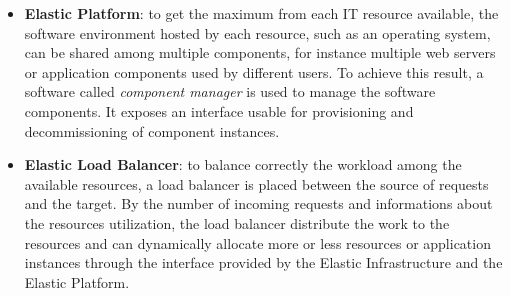 \begin{itemize}
	\item \textbf{Elastic Platform}: to get the maximum from each IT resource available, the software environment hosted by each resource, such as an operating system, can be shared among multiple components, for instance multiple web servers or application components used by different users. To achieve this result, a software called  \textit{component manager} is used to manage the software components. It exposes an interface usable for provisioning and decommissioning of component instances.
	\item \textbf{Elastic Load Balancer}: to balance correctly the workload among the available resources, a load balancer is placed between the source of requests and the target. By the number of incoming requests and informations about the resources utilization, the load balancer distribute the work to the resources and can dynamically allocate more or less resources or application instances through the interface provided by the Elastic Infrastructure and the Elastic Platform.
\end{itemize}
